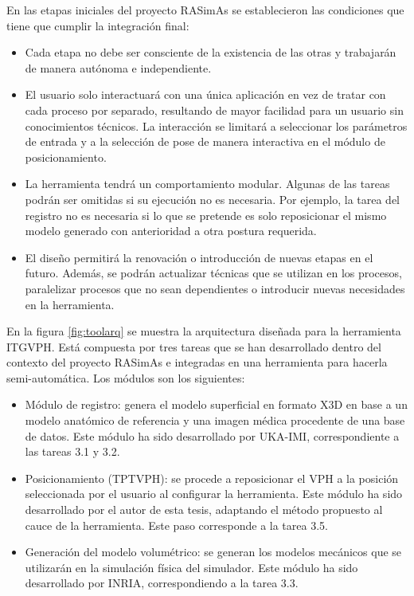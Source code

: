 
En las etapas iniciales del proyecto \ac{RASimAs} se establecieron las condiciones que tiene que cumplir la integración final:
\begin{itemize}
    \item Cada etapa no debe ser consciente de la existencia de las otras y trabajarán de manera autónoma e independiente.
    
    \item El usuario solo interactuará con una única aplicación en vez de tratar con cada proceso por separado, resultando de mayor facilidad para un usuario sin conocimientos técnicos. La interacción se limitará a seleccionar los parámetros de entrada y a la selección de pose de manera interactiva en el módulo de posicionamiento.
    
    \item La herramienta tendrá un comportamiento modular. Algunas de las tareas podrán ser omitidas si su ejecución no es necesaria. Por ejemplo, la tarea del registro no es necesaria si lo que se pretende es solo reposicionar el mismo modelo generado con anterioridad a otra postura requerida.
    
    \item El diseño permitirá la renovación o introducción de nuevas etapas en el futuro. Además, se podrán actualizar técnicas que se utilizan en los procesos, paralelizar procesos que no sean dependientes o introducir nuevas necesidades en la herramienta.
\end{itemize}

En la figura \ref{fig:toolarq} se muestra la arquitectura diseñada para la herramienta \ac{ITGVPH}.  Está compuesta por tres tareas que se han desarrollado dentro del contexto del proyecto \ac{RASimAs} e integradas en una herramienta para hacerla semi-automática. Los módulos son los siguientes: 
\begin{itemize}
    \item Módulo de registro:
    genera el modelo superficial en formato \ac{X3D} en base a un modelo anatómico de referencia y una imagen médica procedente de una base de datos. Este módulo ha sido desarrollado por \ac{UKA-IMI}, correspondiente a las tareas 3.1 y 3.2.
    \item Posicionamiento (\ac{TPTVPH}):
    se procede a reposicionar el \ac{VPH} a la posición seleccionada por el usuario al configurar la herramienta. Este módulo ha sido desarrollado por el autor de esta tesis, adaptando el método propuesto al cauce de la herramienta. Este paso corresponde a la tarea 3.5.
    \item Generación del modelo volumétrico:
    se generan los modelos mecánicos que se utilizarán en la simulación física del simulador. Este módulo ha sido desarrollado por \ac{INRIA}, correspondiendo a la tarea 3.3.
\end{itemize}

